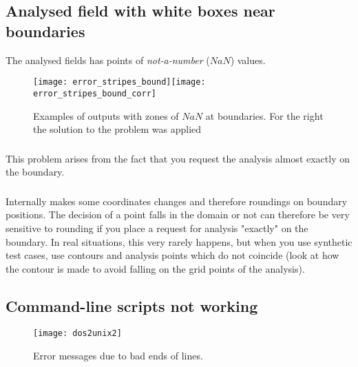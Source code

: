 
\subsection{Analysed field with white boxes near boundaries}

The analysed fields has points of \textit{not-a-number} ($NaN$) values.

\begin{figure}[htpb]
\centering
\texttt{[image: error\_stripes\_bound]}\texttt{[image: error\_stripes\_bound\_corr]}
\caption{Examples of \diva outputs with zones of $NaN$ at boundaries. For the right the solution to the problem was applied \label{fig:error_stripes}}
\end{figure}

\subsubsection{\question}

This problem arises from the fact that you request the analysis almost exactly on the boundary.



\subsubsection{\answer}

Internally \diva makes some coordinates changes and therefore roundings on boundary positions. The decision of a point falls in the domain or not can therefore be very sensitive
to rounding if you place a request for analysis "exactly" on the boundary. In real situations, this very rarely happens, but when you use synthetic test cases, use contours and analysis points which do not coincide (look at  how the contour is made to avoid falling on the grid points of the analysis).



\subsection{Command-line scripts not working}


\begin{figure}[htpb]
\centering
\texttt{[image: dos2unix2]}
\caption{Error messages due to bad ends of lines. \label{fig:error_dos2unix}}
\end{figure}


